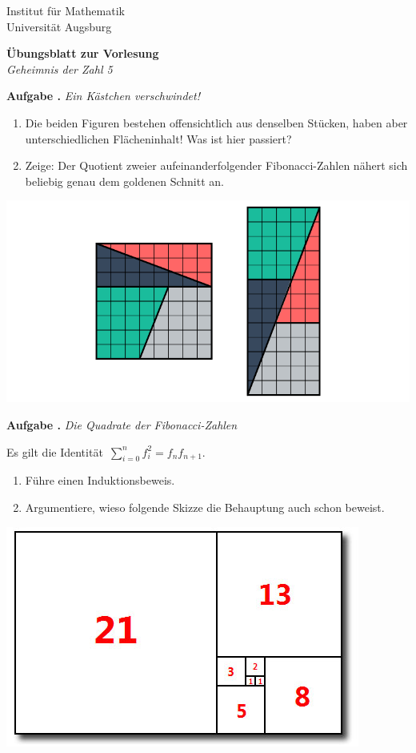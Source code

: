 \documentclass[a4paper,ngerman]{scrartcl}
\newlength{\aufgabenskip}
\newcounter{aufgabennummer}
\newenvironment{aufgabe}[1]{
  \addtocounter{aufgabennummer}{1}
  \textbf{Aufgabe \theaufgabennummer.} \emph{#1} \par
}{\vspace{\aufgabenskip}}
\begin{document}
Institut für Mathematik \\
Universität Augsburg

\begin{center}
  \textbf{Übungsblatt zur Vorlesung} \\
  \emph{Geheimnis der Zahl 5}
\end{center}
\vspace{1em}

\begin{aufgabe}{Ein Kästchen verschwindet!}
\begin{enumerate}
\item Die beiden Figuren bestehen offensichtlich aus denselben Stücken, haben
aber unterschiedlichen Flächeninhalt! Was ist hier passiert?
\item Zeige: Der Quotient zweier aufeinanderfolgender Fibonacci-Zahlen nähert
sich beliebig genau dem goldenen Schnitt an.
\end{enumerate}
\begin{center}
  \includegraphics[scale=0.3]{ein-kaestchen-verschwindet}
\end{center}
\end{aufgabe}

\begin{aufgabe}{Die Quadrate der Fibonacci-Zahlen}
Es gilt die Identität~$\sum_{i=0}^n f_i^2 = f_n f_{n+1}$.
\begin{enumerate}
\item Führe einen Induktionsbeweis.
\item Argumentiere, wieso folgende Skizze die Behauptung auch schon beweist.
\end{enumerate}
\begin{center}
  \includegraphics[scale=0.3]{fibonacci-quadrate}
\end{center}
\end{aufgabe}
\end{document}
